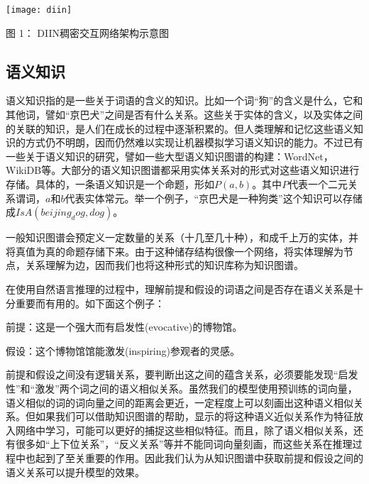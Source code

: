 \documentclass[UTF8,11pt,a4paper,nofonts]{ctexart}
\begin{document}
\begin{table}[htbp!]
\centering
\texttt{[image: diin]}
\caption*{图 1： DIIN稠密交互网络架构示意图}%
\end{table}

\subsection{语义知识}
语义知识指的是一些关于词语的含义的知识。比如一个词“狗”的含义是什么，它和其他词，譬如“京巴犬”之间是否有什么关系。这些关于实体的含义，以及实体之间的关联的知识，是人们在成长的过程中逐渐积累的。但人类理解和记忆这些语义知识的方式仍不明朗，因而仍然难以实现让机器模拟学习语义知识的能力。不过已有一些关于语义知识的研究，譬如一些大型语义知识图谱的构建：WordNet，WikiDB等。大部分的语义知识图谱都采用实体关系对的形式对这些语义知识进行存储。具体的，一条语义知识是一个命题，形如$P(a, b)$。其中$P$代表一个二元关系谓词，$a$和$b$代表实体常元。举一个例子，“京巴犬是一种狗类”这个知识可以存储成$IsA(beijing_dog, dog)$。

一般知识图谱会预定义一定数量的关系（十几至几十种），和成千上万的实体，并将真值为真的命题存储下来。由于这种储存结构很像一个网络，将实体理解为节点，关系理解为边，因而我们也将这种形式的知识库称为知识图谱。


在使用自然语言推理的过程中，理解前提和假设的词语之间是否存在语义关系是十分重要而有用的。如下面这个例子：
    

前提：这是一个强大而有启发性(evocative)的博物馆。

假设：这个博物馆馆能激发(inspiring)参观者的灵感。

前提和假设之间没有逻辑关系，要判断出这之间的蕴含关系，必须要能发现“启发性”和“激发”两个词之间的语义相似关系。虽然我们的模型使用预训练的词向量，语义相似的词的词向量之间的距离会更近，一定程度上可以刻画出这种语义相似关系。但如果我们可以借助知识图谱的帮助，显示的将这种语义近似关系作为特征放入网络中学习，可能可以更好的捕捉这些相似特征。而且，除了语义相似关系，还有很多如“上下位关系”，“反义关系”等并不能同词向量刻画，而这些关系在推理过程中也起到了至关重要的作用。因此我们认为从知识图谱中获取前提和假设之间的语义关系可以提升模型的效果。
\end{document}
